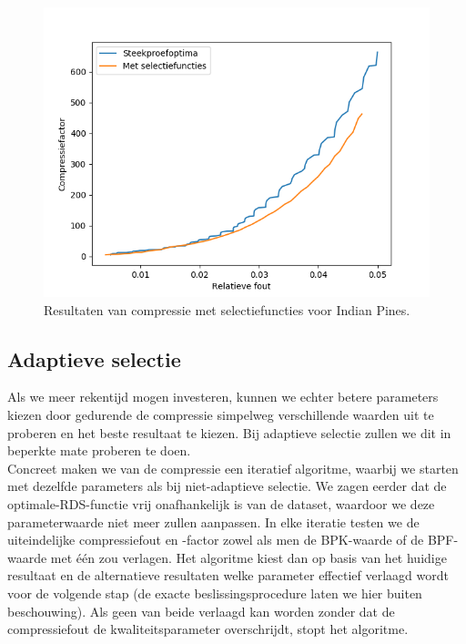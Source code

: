 \begin{figure}[H]
  \centering
  \includegraphics[scale=0.7]{images/parameter_functions_results_Indian_Pines.png}
  \caption{Resultaten van compressie met selectiefuncties voor Indian Pines.}
  \label{fig:parameter_functions_results_Indian_Pines}
\end{figure}

\newpage
\subsection{Adaptieve selectie}

Als we meer rekentijd mogen investeren, kunnen we echter betere parameters kiezen door gedurende de compressie simpelweg verschillende waarden uit te proberen en het beste resultaat te kiezen. Bij adaptieve selectie zullen we dit in beperkte mate proberen te doen.\\

Concreet maken we van de compressie een iteratief algoritme, waarbij we starten met dezelfde parameters als bij niet-adaptieve selectie. We zagen eerder dat de optimale-RDS-functie vrij onafhankelijk is van de dataset, waardoor we deze parameterwaarde niet meer zullen aanpassen. In elke iteratie testen we de uiteindelijke compressiefout en -factor zowel als men de BPK-waarde of de BPF-waarde met \'e\'en zou verlagen. Het algoritme kiest dan op basis van het huidige resultaat en de alternatieve resultaten welke parameter effectief verlaagd wordt voor de volgende stap (de exacte beslissingsprocedure laten we hier buiten beschouwing). Als geen van beide verlaagd kan worden zonder dat de compressiefout de kwaliteitsparameter overschrijdt, stopt het algoritme.\\

